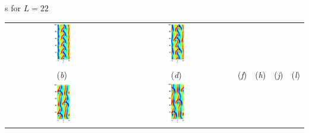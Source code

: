 \documentclass{theo1poster}[2003/04/25]
\begin{document}
\begin{poster}{3}
\begin{sheet}{\Rpo s for $L=22$}
\begin{center}
\begin{tabular}{cccccc}
\includegraphics[width=0.15\textwidth]{../../figs/ks22rpo020.5-00.00.eps}\hspace{-3ex} &
\includegraphics[width=0.15\textwidth]{../../figs/ks22rpo066.8-00.00.eps}\\
(\textit{b}) & (\textit{d}) & (\textit{f}) &
(\textit{h}) & (\textit{j}) & (\textit{l})\\
\includegraphics[width=0.15\textwidth]{../../figs/ks22rpo032.8-10.96.eps}\hspace{-3ex} &
\includegraphics[width=0.15\textwidth]{../../figs/ks22rpo034.6-09.60.eps}\hspace{-3ex} &

\end{tabular}
\end{center}
\end{sheet}
\end{poster}
\end{document}
